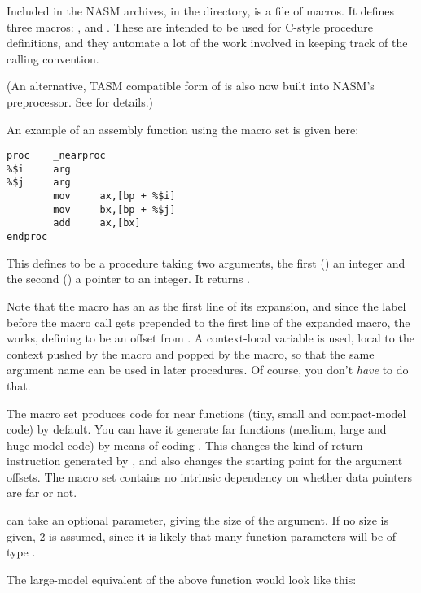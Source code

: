 
Included in the NASM archives, in the 
directory, is a file  of macros. It defines three macros:
,  and . These are intended
to be used for C-style procedure definitions, and they automate a lot of
the work involved in keeping track of the calling convention.

(An alternative, TASM compatible form of  is also now built
into NASM's preprocessor. See  for details.)

An example of an assembly function using the macro set is given
here:

\begin{lstlisting}
proc    _nearproc
%$i     arg
%$j     arg
        mov     ax,[bp + %$i]
        mov     bx,[bp + %$j]
        add     ax,[bx]
endproc
\end{lstlisting}

This defines  to be a procedure taking two arguments,
the first () an integer and the second () a pointer to an
integer. It returns .

Note that the  macro has an  as the first line of its
expansion, and since the label before the macro call gets prepended
to the first line of the expanded macro, the  works, defining
 to be an offset from . A context-local variable is
used, local to the context pushed by the  macro and popped
by the  macro, so that the same argument name can be used
in later procedures. Of course, you don't \emph{have} to do that.

The macro set produces code for near functions (tiny, small and
compact-model code) by default. You can have it generate far
functions (medium, large and huge-model code) by means of coding
. This changes the kind of
return instruction generated by , and also changes the
starting point for the argument offsets. The macro set contains no
intrinsic dependency on whether data pointers are far or not.

 can take an optional parameter, giving the size of the
argument. If no size is given, 2 is assumed, since it is likely that
many function parameters will be of type .

The large-model equivalent of the above function would look like this:

